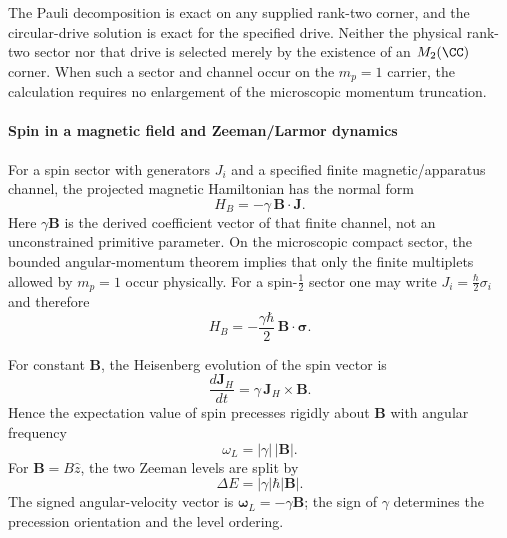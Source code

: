 \documentclass[12pt,a4paper]{article}
\begin{document}
\begin{remark}
\label{p4:rem:rabi-framework}
The Pauli decomposition is exact on any supplied rank-two corner, and the
circular-drive solution is exact for the specified drive.  Neither the
physical rank-two sector nor that drive is selected merely by the existence of
an \(M_2(\CC)\) corner.  When such a sector and channel occur on the
\(m_p=1\) carrier, the calculation requires no enlargement of the microscopic
momentum truncation.
\end{remark}



\paragraph{Spin in a magnetic field and Zeeman/Larmor dynamics}
\label{p4:sec:part2-zeeman}

For a spin sector with generators $J_i$ and a specified finite magnetic/apparatus channel, the projected magnetic Hamiltonian has the normal form
\begin{equation}
\label{p4:eq:zeeman}
H_B=-\gamma\,\mathbf B\cdot \mathbf J.
\end{equation}
Here \(\gamma\mathbf B\) is the derived coefficient vector of that finite channel, not an unconstrained primitive parameter.  On the microscopic compact sector, the bounded angular-momentum theorem implies that only the finite multiplets allowed by $m_p=1$ occur physically.
For a spin-$\frac12$ sector one may write $J_i=\frac{\hbar}{2}\sigma_i$ and therefore
\begin{equation}
\label{p4:eq:zeeman-half}
H_B=-\frac{\gamma\hbar}{2}\,\mathbf B\cdot\boldsymbol\sigma.
\end{equation}

\begin{proposition}
\label{p4:prop:larmor}
For constant $\mathbf B$, the Heisenberg evolution of the spin vector is
\begin{equation}
\label{p4:eq:larmor}
\frac{d\mathbf J_H}{dt}=\gamma\,\mathbf J_H\times \mathbf B.
\end{equation}
Hence the expectation value of spin precesses rigidly about $\mathbf B$ with angular frequency
\begin{equation}
\label{p4:eq:larmor-frequency}
\omega_L=|\gamma|\,|\mathbf B|.
\end{equation}
For $\mathbf B=B\hat z$, the two Zeeman levels are split by
\begin{equation}
\label{p4:eq:zeeman-splitting}
\Delta E = |\gamma|\hbar |\mathbf B|.
\end{equation}
The signed angular-velocity vector is
\(\boldsymbol\omega_L=-\gamma\mathbf B\); the sign of \(\gamma\) determines
the precession orientation and the level ordering.
\end{proposition}
\end{document}
